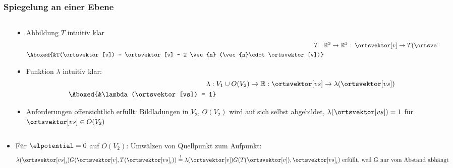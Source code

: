 \begin{frame}
  \frametitle{Spiegelung an einer Ebene}
  \begin{columns}
    \begin{column}{.3\textwidth}
\end{column}
\begin{column}{.65\textwidth}
  \begin{itemize}[<+->]
  \item Abbildung $T$ intuitiv klar
    \begin{align*}
      T:\; &\mathbb{R}^3 \to \mathbb{R}^3: \; \ortsvektor[v] \to T(\ortsvektor[v]) \nonumber\\
      \Aboxed{&T(\ortsvektor[v]) = \ortsvektor[v] - 2 \vec{n} (\vec{n}\cdot \ortsvektor[v])}
    \end{align*}
  \item Funktion $\lambda$ intuitiv klar:
    \begin{align*}
      \lambda:\; &V_1\cup O(V_2) \to \mathbb{R}: \ortsvektor[vs] \to \lambda(\ortsvektor[vs])\nonumber\\
      \Aboxed{&\lambda(\ortsvektor[vs]) = 1}
    \end{align*}
    \item Anforderungen offensichtlich erfüllt: Bildladungen in $V_2$, $O(V_2)$ wird auf sich selbst abgebildet, $\lambda(\ortsvektor[vs]) = 1$ für $\ortsvektor[vs] \in O(V_2)$ 
    \end{itemize}
  \end{column}
\end{columns}
\pause
\begin{itemize}
\item Für $\elpotential = 0$ auf $O(V_2)$: Umwälzen von Quellpunkt zum Aufpunkt:
  \begin{equation*}
    \lambda(\ortsvektor[vs]_i) G(\ortsvektor[v],T(\ortsvektor[vs]_i)) \stackrel{!}{=}  \lambda(\ortsvektor[v]) G(T(\ortsvektor[v]),\ortsvektor[vs]_i) \text{ erfüllt, weil G nur vom Abstand abhängt}
    \end{equation*}
  \end{itemize}
\end{frame}

